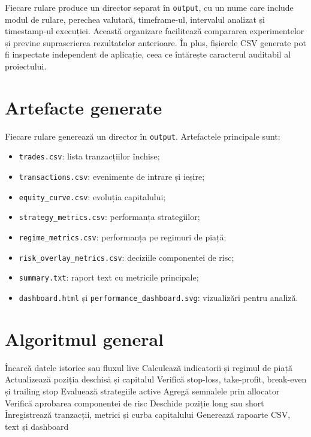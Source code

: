 Fiecare rulare produce un director separat în \texttt{output}, cu un nume care include modul de rulare, perechea valutară, timeframe-ul, intervalul analizat și timestamp-ul execuției. Această organizare facilitează compararea experimentelor și previne suprascrierea rezultatelor anterioare. În plus, fișierele CSV generate pot fi inspectate independent de aplicație, ceea ce întărește caracterul auditabil al proiectului.

\section{Artefacte generate}
\label{cap:cap3:artefacte}

Fiecare rulare generează un director în \texttt{output}. Artefactele principale sunt:
\begin{itemize}
    \item \texttt{trades.csv}: lista tranzacțiilor închise;
    \item \texttt{transactions.csv}: evenimente de intrare și ieșire;
    \item \texttt{equity\_curve.csv}: evoluția capitalului;
    \item \texttt{strategy\_metrics.csv}: performanța strategiilor;
    \item \texttt{regime\_metrics.csv}: performanța pe regimuri de piață;
    \item \texttt{risk\_overlay\_metrics.csv}: deciziile componentei de risc;
    \item \texttt{summary.txt}: raport text cu metricile principale;
    \item \texttt{dashboard.html} și \texttt{performance\_dashboard.svg}: vizualizări pentru analiză.
\end{itemize}

\section{Algoritmul general}
\label{cap:cap3:algoritm}

\begin{algorithm}[H]
    \caption{Fluxul decizional al sistemului}
    \label{alg:flux_decizional}
    \begin{algorithmic}[1]
            \State Încarcă datele istorice sau fluxul live
            \State Calculează indicatorii și regimul de piață
                \State Actualizează poziția deschisă și capitalul
                \State Verifică stop-loss, take-profit, break-even și trailing stop
                \State Evaluează strategiile active
                \State Agregă semnalele prin allocator
                \State Verifică aprobarea componentei de risc
                    \State Deschide poziție long sau short
                \EndIf
                \State Înregistrează tranzacții, metrici și curba capitalului
            \EndFor
            \State Generează rapoarte CSV, text și dashboard
        \EndProcedure
    \end{algorithmic}
\end{algorithm}
